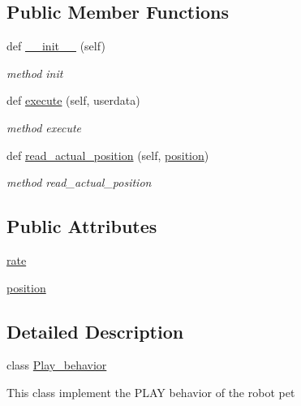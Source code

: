 \subsection*{Public Member Functions}
\begin{DoxyCompactItemize}
\item 
def \hyperlink{classbehavior__manager_1_1Play__behavior_aaa6ce2b1855d0a235e324df41d8519a1}{\+\_\+\+\_\+init\+\_\+\+\_\+} (self)
\begin{DoxyCompactList}\small\item\em method init \end{DoxyCompactList}\item 
def \hyperlink{classbehavior__manager_1_1Play__behavior_a6c5231ed8f406c82e06c741e89b0f666}{execute} (self, userdata)
\begin{DoxyCompactList}\small\item\em method execute \end{DoxyCompactList}\item 
def \hyperlink{classbehavior__manager_1_1Play__behavior_ac6975390035059fb446cd40cc16e80e3}{read\+\_\+actual\+\_\+position} (self, \hyperlink{classbehavior__manager_1_1Play__behavior_a99adc036c844a25d09e636895f55ce33}{position})
\begin{DoxyCompactList}\small\item\em method read\+\_\+actual\+\_\+position \end{DoxyCompactList}\end{DoxyCompactItemize}
\subsection*{Public Attributes}
\begin{DoxyCompactItemize}
\item 
\hyperlink{classbehavior__manager_1_1Play__behavior_af636412228a2da30ad114266cbd121e3}{rate}
\item 
\hyperlink{classbehavior__manager_1_1Play__behavior_a99adc036c844a25d09e636895f55ce33}{position}
\end{DoxyCompactItemize}


\subsection{Detailed Description}
class \hyperlink{classbehavior__manager_1_1Play__behavior}{Play\+\_\+behavior} 

This class implement the P\+L\+AY behavior of the robot pet

